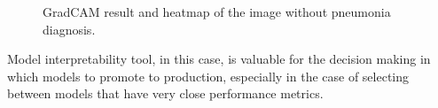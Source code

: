 

\begin{figure}[H]%
    \centering
    \qquad
    \caption{GradCAM result and heatmap of the image without pneumonia diagnosis.}%
    \label{fig:camnormal}%
\end{figure}

Model interpretability tool, in this case, is valuable for the decision making in which models to promote to production, especially in the case of selecting between models that have very close performance metrics.


